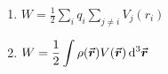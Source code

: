 

\vspace*{\fill}
\centering

\begin{enumerate}
    \item $\displaystyle W = \frac{1}{2}\sum_{i} q_{i} \sum_{j \ne i} V_{j}(r_{i})$ 
    \item $\displaystyle W = \frac{1}{2}\int \rho(\va*{r})V(\va*{r}) \dd[3]{\va*{r}}$
\end{enumerate}

\centering
\vspace*{\fill}

